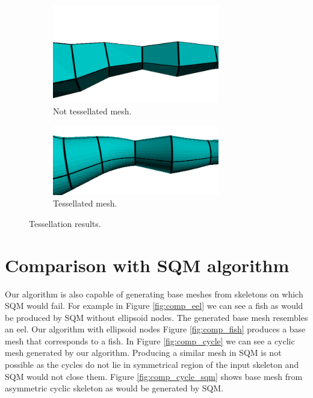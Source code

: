 \begin{figure}[h]
        \centering
        \begin{subfigure}[b]{0.4\textwidth}
        	\centering
                \includegraphics[width=0.8\textwidth]{images/not_tessellated_mesh.png}
                \caption{Not tessellated mesh.}
                \label{fig:no_tess}
        \end{subfigure}
        \qquad %
        \begin{subfigure}[b]{0.4\textwidth}
        	\centering
                \includegraphics[width=0.8\textwidth]{images/tessellated_mesh.png}
                \caption{Tessellated mesh.}
                \label{fig:tess}
        \end{subfigure}
        \caption[Tessellation results]{Tessellation results.}\label{fig:tes_notess}
\end{figure}

\section{Comparison with SQM algorithm}

Our algorithm is also capable of generating base meshes from skeletons on which SQM would fail.
For example in Figure \ref{fig:comp_eel} we can see a fish as would be produced by SQM without ellipsoid nodes.
The generated base mesh resembles an eel.
Our algorithm with ellipsoid nodes Figure \ref{fig:comp_fish} produces a base mesh that corresponds to a fish.
In Figure \ref{fig:comp_cycle} we can see a cyclic mesh generated by our algorithm.
Producing a similar mesh in SQM is not possible as the cycles do not lie in symmetrical region of the input skeleton and SQM would not close them.
Figure \ref{fig:comp_cycle_sqm} shows base mesh from asymmetric cyclic skeleton as would be generated by SQM.

